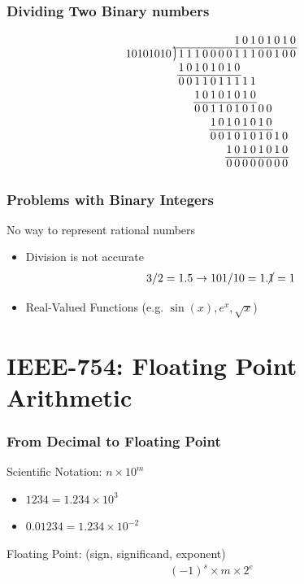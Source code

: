 \documentclass[10pt]{beamer}
\newcommand{\longdiv}{\smash{\mkern-0.43mu\vstretch{1.31}{\hstretch{.7}{)}}\mkern-5.2mu\vstretch{1.31}{\hstretch{.7}{)}}}}
\begin{document}
\begin{frame}
    \frametitle{Dividing Two Binary numbers}
    \begin{align*}
        \arraycolsep=1pt
        \begin{array}{ccccccccccccccccc}
            &          &&&&&&&& 1 &0 &1& 0 & 1&0&1&0  \\
    \cline{2-17}
    10101010&\longdiv  & 1 & 1 & 1 & 0 & 0 & 0 & 0 & 1 & 1 & 1 & 0 & 0 & 1 & 0 & 0 \\
            &          & 1 & 0 & 1 & 0 & 1 & 0 & 1 & 0 &      \\
    \cline{3-10}
            &          & 0 & 0 & 1 & 1 & 0 & 1 & 1 & 1 & 1 & 1  \\
            &          &   &   & 1 & 0 & 1 & 0 & 1 & 0 & 1 & 0  \\
    \cline{5-12}
            &          &   &   & 0 & 0 & 1 & 1 & 0 & 1 & 0 & 1 & 0 & 0  \\
            &          &   &   &   &   & 1 & 0 & 1 & 0 & 1 & 0 & 1 & 0  \\
    \cline{7-14}
            &          &   &   &   &   & 0 & 0 & 1 & 0 & 1 & 0 & 1 & 0 & 1 & 0   \\
            &          &   &   &   &   &   &   & 1 & 0 & 1 & 0 & 1 & 0 & 1 & 0   \\
    \cline{9-16}
            &          &   &   &   &   &   &   & 0 & 0 & 0 & 0 & 0 & 0 & 0 & 0
        \end{array}
    \end{align*}
\end{frame}

\begin{frame}
    \frametitle{Problems with Binary Integers}
    No way to represent rational numbers \pause
    \begin{itemize}
        \item Division is not accurate
        \begin{align*}
            3 / 2 = 1.5 \to 101 / 10 = 1.\cancel{1} = 1
        \end{align*} \pause
        \item Real-Valued Functions (e.g. $\sin(x), e^{x}, \sqrt{x}$)
    \end{itemize}
\end{frame}
 
\section{IEEE-754: Floating Point Arithmetic}
\begin{frame}
    \frametitle{From Decimal to Floating Point}
    Scientific Notation: $n \times 10^m$
    \begin{itemize}
        \item $1234 = 1.234 \times 10^3$
        \item $0.01234 = 1.234 \times 10^{-2}$
    \end{itemize} \pause
    Floating Point: (sign, significand, exponent)
    \begin{align*}
        (-1)^s \times m \times 2^{e}
    \end{align*}
\end{frame}
\end{document}
